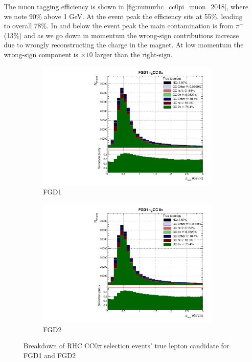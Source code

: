 The muon tagging efficiency is shown in \autoref{fig:numurhc_cc0pi_muon_2018}, where we note 90\% above 1 GeV. At the event peak the efficiency sits at 55\%, leading to overall 78\%. In and below the event peak the main contamination is from $\pi^-$ (13\%) and as we go down in momentum the wrong-sign contributions increase due to wrongly reconstructing the charge in the magnet. At low momentum the wrong-sign component is $\times10$ larger than the right-sign.
\begin{figure}[h]
	\begin{subfigure}[t]{0.49\textwidth}
		\includegraphics[width=\textwidth,page=26, trim={0mm 0mm 0mm 9mm}, clip]{figures/mach3/2018/Selection/2018_RedNDmatrix_rebin_verbose_may_noweights_diagnostics}
		\caption{FGD1}
	\end{subfigure}
	\begin{subfigure}[t]{0.49\textwidth}
		\includegraphics[width=\textwidth,page=32, trim={0mm 0mm 0mm 9mm}, clip]{figures/mach3/2018/Selection/2018_RedNDmatrix_rebin_verbose_may_noweights_diagnostics}
		\caption{FGD2}
	\end{subfigure}
	\caption{Breakdown of \numu RHC CC0$\pi$ selection events' true lepton candidate for FGD1 and FGD2}
	\label{fig:numurhc_cc0pi_muon_2018}
\end{figure}

